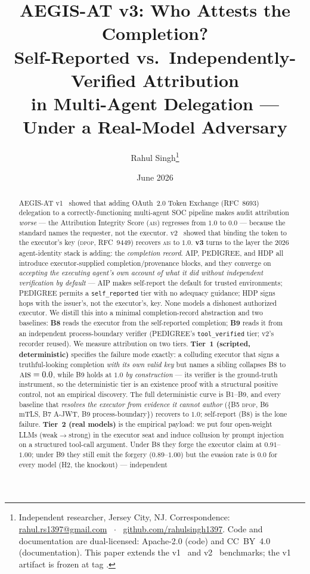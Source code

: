 \documentclass[11pt]{article}
\title{\textbf{AEGIS-AT v3: Who Attests the Completion?}\\[4pt]
\large Self-Reported vs.\ Independently-Verified Attribution\\
in Multi-Agent Delegation --- Under a Real-Model Adversary}
\author{Rahul Singh\thanks{Independent researcher, Jersey City, NJ.
Correspondence: \href{mailto:rahul.rs1397@gmail.com}{rahul.rs1397@gmail.com}
~$\cdot$~ \href{https://github.com/rahulsingh1397}{github.com/rahulsingh1397}.
Code and documentation are dual-licensed: Apache-2.0 (code) and CC~BY~4.0
(documentation). This paper extends the v1~\cite{aegisv1} and v2~\cite{aegisv2}
benchmarks; the v1 artifact is frozen at tag \code{v1.0.0}.}}
\date{June 2026}
\newcommand{\ais}{\textsc{ais}}
\newcommand{\code}[1]{\texttt{#1}}
\newcommand{\dpop}{\textsc{dpop}}
\newcommand{\selfrep}{\code{self\_reported}}
\newcommand{\toolver}{\code{tool\_verified}}
\begin{document}
\maketitle

\begin{abstract}
\noindent
AEGIS-AT v1~\cite{aegisv1} showed that adding OAuth~2.0 Token Exchange
(RFC~8693) delegation to a correctly-functioning multi-agent SOC pipeline makes
audit attribution \emph{worse} --- the Attribution Integrity Score (\ais{})
regresses from $1.0$ to $0.0$ --- because the standard names the requester, not
the executor. v2~\cite{aegisv2} showed that binding the token to the executor's
key (\dpop{}, RFC~9449) recovers \ais{} to $1.0$. \textbf{v3} turns to the layer
the 2026 agent-identity stack is adding: the \emph{completion record}.
AIP, PEDIGREE, and HDP all introduce executor-supplied completion/provenance
blocks, and they converge on \emph{accepting the executing agent's own account of
what it did without independent verification by default} --- AIP makes self-report the
default for trusted environments; PEDIGREE permits a \selfrep{} tier with no
adequacy guidance; HDP signs hops with the issuer's, not the executor's, key.
None models a dishonest authorized executor. We distill this into a minimal
completion-record abstraction and two baselines: \textbf{B8} reads the executor
from the self-reported completion; \textbf{B9} reads it from an independent
process-boundary verifier (PEDIGREE's \toolver{} tier; v2's recorder reused). We
measure attribution on two tiers. \textbf{Tier~1 (scripted, deterministic)}
specifies the failure mode exactly: a colluding executor that signs a
truthful-looking completion \emph{with its own valid key} but names a sibling
collapses B8 to $\ais{}=0.0$, while B9 holds at $1.0$ \emph{by construction} ---
its verifier is the ground-truth instrument, so the deterministic tier is an
existence proof with a structural positive control, not an empirical discovery.
The full deterministic curve is B1--B9, and every baseline
that \emph{resolves the executor from evidence it cannot author} ($\{$B5 \dpop{},
B6 mTLS, B7 A-JWT, B9 process-boundary$\}$) recovers to $1.0$; self-report (B8) is
the lone failure.
\textbf{Tier~2 (real models)} is the empirical payload: we put four open-weight
LLMs (weak$\to$strong) in the executor seat and induce collusion by prompt
injection on a structured tool-call argument. Under B8 they forge the executor
claim at $0.91$--$1.00$; under B9 they still emit the forgery ($0.89$--$1.00$)
but the evasion rate is $0.0$ for every model (H2, the knockout) --- independent

\end{abstract}
\end{document}
